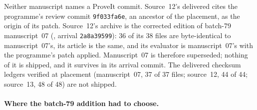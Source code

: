 \documentclass[11pt,letterpaper]{article}
\numberwithin{equation}{section}
\theoremstyle{definition}
\theoremstyle{remark}
\begin{document}
Neither manuscript names a ProveIt commit. Source~12's delivered  cites the programme's review commit \texttt{9f033fa6e}, an ancestor of the placement, as the origin of its patch. Source~12's archive is the corrected edition of batch-79 manuscript~07 (, arrival \texttt{2a8a39599}): 36 of its 38 files are byte-identical to manuscript~07's, its article is the same, and its evaluator  is manuscript~07's with the programme's patch applied. Manuscript~07 is therefore superseded; nothing of it is shipped, and it survives in its arrival commit. The delivered checksum ledgers verified at placement (manuscript~07, 37 of 37 files; source~12, 44 of 44; source~13, 48 of 48) are not shipped.

\paragraph{Where the batch-79 addition had to choose.}
\end{document}
